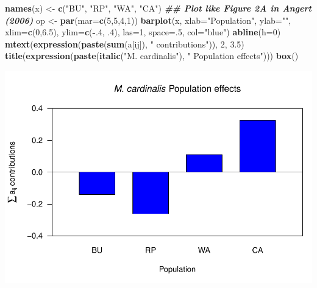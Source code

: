 \documentclass[
]{book}
\newenvironment{Shaded}{\begin{snugshade}}{\end{snugshade}}
\newcommand{\AttributeTok}[1]{\textcolor[rgb]{0.13,0.29,0.53}{#1}}
\newcommand{\DecValTok}[1]{\textcolor[rgb]{0.00,0.00,0.81}{#1}}
\newcommand{\DocumentationTok}[1]{\textcolor[rgb]{0.56,0.35,0.01}{\textbf{\textit{#1}}}}
\newcommand{\FloatTok}[1]{\textcolor[rgb]{0.00,0.00,0.81}{#1}}
\newcommand{\FunctionTok}[1]{\textcolor[rgb]{0.13,0.29,0.53}{\textbf{#1}}}
\newcommand{\NormalTok}[1]{#1}
\newcommand{\OtherTok}[1]{\textcolor[rgb]{0.56,0.35,0.01}{#1}}
\newcommand{\SpecialCharTok}[1]{\textcolor[rgb]{0.81,0.36,0.00}{\textbf{#1}}}
\newcommand{\StringTok}[1]{\textcolor[rgb]{0.31,0.60,0.02}{#1}}
\theoremstyle{definition}
\theoremstyle{definition}
\theoremstyle{definition}
\theoremstyle{definition}
\theoremstyle{remark}
\begin{document}
\begin{Shaded}
\begin{Highlighting}[]
\FunctionTok{names}\NormalTok{(x) }\OtherTok{\textless{}{-}} \FunctionTok{c}\NormalTok{(}\StringTok{"BU"}\NormalTok{, }\StringTok{"RP"}\NormalTok{, }\StringTok{"WA"}\NormalTok{, }\StringTok{"CA"}\NormalTok{)}
\DocumentationTok{\#\# Plot like Figure 2A in Angert (2006)}
\NormalTok{op }\OtherTok{\textless{}{-}} \FunctionTok{par}\NormalTok{(}\AttributeTok{mar=}\FunctionTok{c}\NormalTok{(}\DecValTok{5}\NormalTok{,}\DecValTok{5}\NormalTok{,}\DecValTok{4}\NormalTok{,}\DecValTok{1}\NormalTok{))}
\FunctionTok{barplot}\NormalTok{(x, }\AttributeTok{xlab=}\StringTok{"Population"}\NormalTok{, }\AttributeTok{ylab=}\StringTok{""}\NormalTok{, }\AttributeTok{xlim=}\FunctionTok{c}\NormalTok{(}\DecValTok{0}\NormalTok{,}\FloatTok{6.5}\NormalTok{), }\AttributeTok{ylim=}\FunctionTok{c}\NormalTok{(}\SpecialCharTok{{-}}\NormalTok{.}\DecValTok{4}\NormalTok{, .}\DecValTok{4}\NormalTok{),}
  \AttributeTok{las=}\DecValTok{1}\NormalTok{, }\AttributeTok{space=}\NormalTok{.}\DecValTok{5}\NormalTok{, }\AttributeTok{col=}\StringTok{"blue"}\NormalTok{)}
\FunctionTok{abline}\NormalTok{(}\AttributeTok{h=}\DecValTok{0}\NormalTok{)}
\FunctionTok{mtext}\NormalTok{(}\FunctionTok{expression}\NormalTok{(}\FunctionTok{paste}\NormalTok{(}\FunctionTok{sum}\NormalTok{(a[ij]), }\StringTok{" contributions"}\NormalTok{)), }\DecValTok{2}\NormalTok{, }\FloatTok{3.5}\NormalTok{)}
\FunctionTok{title}\NormalTok{(}\FunctionTok{expression}\NormalTok{(}\FunctionTok{paste}\NormalTok{(}\FunctionTok{italic}\NormalTok{(}\StringTok{"M. cardinalis"}\NormalTok{), }\StringTok{" Population effects"}\NormalTok{)))}
\FunctionTok{box}\NormalTok{()}
\end{Highlighting}
\end{Shaded}

\includegraphics{Diagnostico_Poblacional_files/figure-latex/unnamed-chunk-24-4.pdf}
\end{document}
